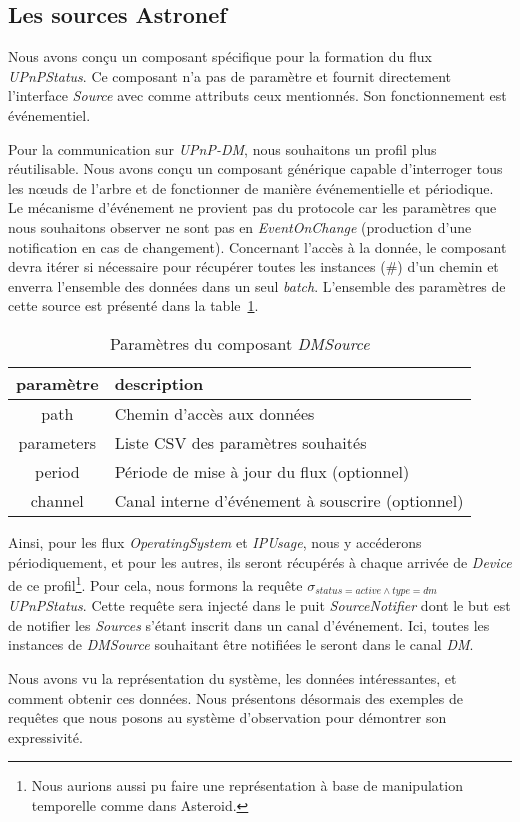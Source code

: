 \subsection{Les sources Astronef}
Nous avons conçu un composant spécifique pour la formation du flux \textit{UPnPStatus}. Ce composant n'a pas de paramètre et fournit directement l'interface \textit{Source} avec comme attributs ceux mentionnés. Son fonctionnement est événementiel.

Pour la communication sur \textit{UPnP-DM}, nous souhaitons un profil plus réutilisable. Nous avons conçu un composant générique capable d'interroger tous les nœuds de l'arbre et de fonctionner de manière événementielle et périodique. Le mécanisme d'événement ne provient pas du protocole car les paramètres que nous souhaitons observer ne sont pas en \textit{EventOnChange} (production d'une notification en cas de changement). Concernant l'accès à la donnée, le composant devra itérer si nécessaire pour récupérer toutes les instances (\#) d'un chemin et enverra l'ensemble des données dans un seul \textit{batch}. L'ensemble des paramètres de cette source est présenté dans la table~\ref{tab:valid:domvision:dmsource}.

\begin{table}[ht]
    \centering
    \begin{tabular}{cl}
        paramètre & description \\ \midrule
        path & Chemin d'accès aux données \\
        parameters & Liste CSV des paramètres souhaités \\
        period & Période de mise à jour du flux (optionnel) \\
        channel & Canal interne d'événement à souscrire (optionnel)
    \end{tabular}
    \caption{Paramètres du composant \textit{DMSource}}\label{tab:valid:domvision:dmsource}
\end{table}

Ainsi, pour les flux \textit{OperatingSystem} et \textit{IPUsage}, nous y accéderons périodiquement, et pour les autres, ils seront récupérés à chaque arrivée de \textit{Device} de ce profil\footnote{Nous aurions aussi pu faire une représentation à base de manipulation temporelle comme dans Asteroid.}. Pour cela, nous formons la requête $\sigma_{status=active\wedge type=dm}$ \textit{UPnPStatus}. Cette requête sera injecté dans le puit \textit{SourceNotifier} dont le but est de notifier les \textit{Sources} s'étant inscrit dans un canal d'événement. Ici, toutes les instances de \textit{DMSource} souhaitant être notifiées le seront dans le canal \textit{DM}.

Nous avons vu la représentation du système, les données intéressantes, et comment obtenir ces données. Nous présentons désormais des exemples de requêtes que nous posons au système d'observation pour démontrer son expressivité.